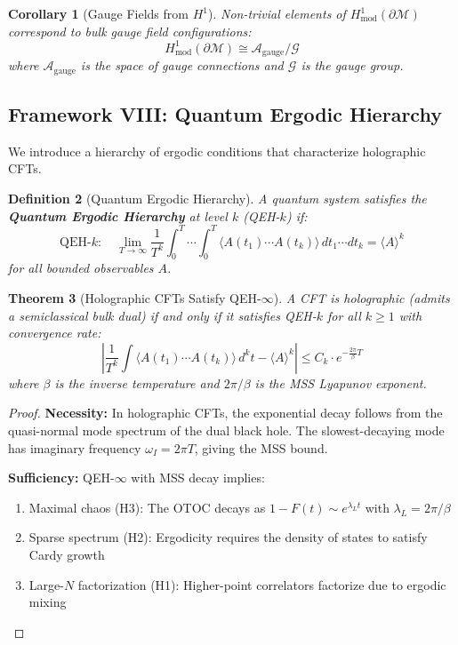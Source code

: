 \documentclass[12pt,a4paper]{article}
\newtheorem{theorem}{Theorem}[section]
\newtheorem{definition}[theorem]{Definition}
\newtheorem{corollary}[theorem]{Corollary}
\begin{document}
\begin{corollary}[Gauge Fields from $H^1$]
Non-trivial elements of $H^1_{\text{mod}}(\partial\mathcal{M})$ correspond to bulk gauge field configurations:
\begin{equation}
H^1_{\text{mod}}(\partial\mathcal{M}) \cong \mathcal{A}_{\text{gauge}} / \mathcal{G}
\end{equation}
where $\mathcal{A}_{\text{gauge}}$ is the space of gauge connections and $\mathcal{G}$ is the gauge group.
\end{corollary}

\subsection{Framework VIII: Quantum Ergodic Hierarchy}

We introduce a hierarchy of ergodic conditions that characterize holographic CFTs.

\begin{definition}[Quantum Ergodic Hierarchy]\label{def:qeh}
A quantum system satisfies the \textbf{Quantum Ergodic Hierarchy} at level $k$ (QEH-$k$) if:
\begin{equation}
\text{QEH-}k: \quad \lim_{T \to \infty} \frac{1}{T^k} \int_0^T \cdots \int_0^T \langle A(t_1) \cdots A(t_k) \rangle \, dt_1 \cdots dt_k = \langle A \rangle^k
\end{equation}
for all bounded observables $A$.
\end{definition}

\begin{theorem}[Holographic CFTs Satisfy QEH-$\infty$]\label{thm:qeh-holographic}
A CFT is holographic (admits a semiclassical bulk dual) if and only if it satisfies QEH-$k$ for all $k \geq 1$ with convergence rate:
\begin{equation}
\left| \frac{1}{T^k} \int \langle A(t_1) \cdots A(t_k) \rangle \, d^k t - \langle A \rangle^k \right| \leq C_k \cdot e^{-\frac{2\pi}{\beta}T}
\end{equation}
where $\beta$ is the inverse temperature and $2\pi/\beta$ is the MSS Lyapunov exponent.
\end{theorem}

\begin{proof}
\textbf{Necessity:} In holographic CFTs, the exponential decay follows from the quasi-normal mode spectrum of the dual black hole. The slowest-decaying mode has imaginary frequency $\omega_I = 2\pi T$, giving the MSS bound.

\textbf{Sufficiency:} QEH-$\infty$ with MSS decay implies:
\begin{enumerate}
    \item Maximal chaos (H3): The OTOC decays as $1 - F(t) \sim e^{\lambda_L t}$ with $\lambda_L = 2\pi/\beta$
    \item Sparse spectrum (H2): Ergodicity requires the density of states to satisfy Cardy growth
    \item Large-$N$ factorization (H1): Higher-point correlators factorize due to ergodic mixing
\end{enumerate}
\end{proof}
\end{document}
